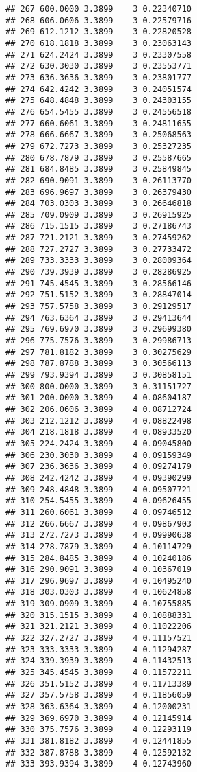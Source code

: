 \documentclass[
]{article}
\begin{document}
\begin{verbatim}
## 267 600.0000 3.3899    3 0.22340710
## 268 606.0606 3.3899    3 0.22579716
## 269 612.1212 3.3899    3 0.22820528
## 270 618.1818 3.3899    3 0.23063143
## 271 624.2424 3.3899    3 0.23307558
## 272 630.3030 3.3899    3 0.23553771
## 273 636.3636 3.3899    3 0.23801777
## 274 642.4242 3.3899    3 0.24051574
## 275 648.4848 3.3899    3 0.24303155
## 276 654.5455 3.3899    3 0.24556518
## 277 660.6061 3.3899    3 0.24811655
## 278 666.6667 3.3899    3 0.25068563
## 279 672.7273 3.3899    3 0.25327235
## 280 678.7879 3.3899    3 0.25587665
## 281 684.8485 3.3899    3 0.25849845
## 282 690.9091 3.3899    3 0.26113770
## 283 696.9697 3.3899    3 0.26379430
## 284 703.0303 3.3899    3 0.26646818
## 285 709.0909 3.3899    3 0.26915925
## 286 715.1515 3.3899    3 0.27186743
## 287 721.2121 3.3899    3 0.27459262
## 288 727.2727 3.3899    3 0.27733472
## 289 733.3333 3.3899    3 0.28009364
## 290 739.3939 3.3899    3 0.28286925
## 291 745.4545 3.3899    3 0.28566146
## 292 751.5152 3.3899    3 0.28847014
## 293 757.5758 3.3899    3 0.29129517
## 294 763.6364 3.3899    3 0.29413644
## 295 769.6970 3.3899    3 0.29699380
## 296 775.7576 3.3899    3 0.29986713
## 297 781.8182 3.3899    3 0.30275629
## 298 787.8788 3.3899    3 0.30566113
## 299 793.9394 3.3899    3 0.30858151
## 300 800.0000 3.3899    3 0.31151727
## 301 200.0000 3.3899    4 0.08604187
## 302 206.0606 3.3899    4 0.08712724
## 303 212.1212 3.3899    4 0.08822498
## 304 218.1818 3.3899    4 0.08933520
## 305 224.2424 3.3899    4 0.09045800
## 306 230.3030 3.3899    4 0.09159349
## 307 236.3636 3.3899    4 0.09274179
## 308 242.4242 3.3899    4 0.09390299
## 309 248.4848 3.3899    4 0.09507721
## 310 254.5455 3.3899    4 0.09626455
## 311 260.6061 3.3899    4 0.09746512
## 312 266.6667 3.3899    4 0.09867903
## 313 272.7273 3.3899    4 0.09990638
## 314 278.7879 3.3899    4 0.10114729
## 315 284.8485 3.3899    4 0.10240186
## 316 290.9091 3.3899    4 0.10367019
## 317 296.9697 3.3899    4 0.10495240
## 318 303.0303 3.3899    4 0.10624858
## 319 309.0909 3.3899    4 0.10755885
## 320 315.1515 3.3899    4 0.10888331
## 321 321.2121 3.3899    4 0.11022206
## 322 327.2727 3.3899    4 0.11157521
## 323 333.3333 3.3899    4 0.11294287
## 324 339.3939 3.3899    4 0.11432513
## 325 345.4545 3.3899    4 0.11572211
## 326 351.5152 3.3899    4 0.11713389
## 327 357.5758 3.3899    4 0.11856059
## 328 363.6364 3.3899    4 0.12000231
## 329 369.6970 3.3899    4 0.12145914
## 330 375.7576 3.3899    4 0.12293119
## 331 381.8182 3.3899    4 0.12441855
## 332 387.8788 3.3899    4 0.12592132
## 333 393.9394 3.3899    4 0.12743960

\end{verbatim}
\end{document}
